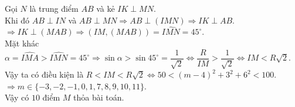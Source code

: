 \begin{ex}
{{				%
		} \noindent
		Gọi $N$ là trung điểm $A B$ và kẻ $IK \perp MN$.\\
		Khi đó $AB\perp IN$ và $AB\perp MN \Rightarrow AB\perp (IMN)\Rightarrow IK\perp AB$.\\
		$\Rightarrow IK \perp(MAB) \Rightarrow(I M,(M A B))=\widehat{I M N}=45^\circ$.\\
		Mặt khác $\alpha=\widehat{IMA}>\widehat{I M N}=45^\circ \Rightarrow \sin \alpha>\sin 45^\circ=\dfrac{1}{\sqrt{2}}\Leftrightarrow \dfrac{R}{I M}>\dfrac{1}{\sqrt{2}}\Leftrightarrow I M<R \sqrt{2}$.\\
		Vậy ta có điều kiện là $R<I M<R \sqrt{2}\Leftrightarrow 50<(m-4)^2+3^2+6^2<100$.\\
		$\Rightarrow m \in\{-3,-2,-1,0,1,7,8,9,10,11\}$.\\
		Vậy có $10$ điểm $M$ thỏa bài toán.
	}
\end{ex}
